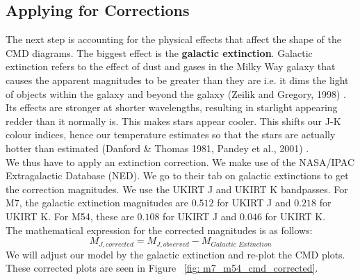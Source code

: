 \documentclass[12pt]{article}
\begin{document}
		\subsection{Applying for Corrections}
		The next step is accounting for the physical effects that affect the shape of the CMD diagrams. The biggest effect is the \textbf{galactic extinction}. Galactic extinction refers to the effect of dust and gases in the Milky Way galaxy that causes the apparent magnitudes to be greater than they are i.e. it dims the light of objects within the galaxy and beyond the galaxy (Zeilik and Gregory, 1998) \cite{zeilik}.\\
		Its effects are stronger at shorter wavelengths, resulting in starlight appearing redder than it normally is. This makes stars appear cooler. This shifts our J-K colour indices, hence our temperature estimates so that the stars are actually hotter than estimated (Danford \& Thomas 1981, Pandey et al., 2001) \cite{pandey}.\\
		We thus have to apply an extinction correction. We make use of the NASA/IPAC Extragalactic Database (NED). We go to their tab on galactic extinctions to get the correction magnitudes. We use the UKIRT J and UKIRT K bandpasses. For M7, the galactic extinction magnitudes are $0.512$ for UKIRT J and $0.218$ for UKIRT K. For M54, these are $0.108$ for UKIRT J and $0.046$ for UKIRT K.\\
		The mathematical expression for the corrected magnitudes is as follows:
		\[M_{J, corrected} = M_{J, observed} - M_{Galactic \,\, Extinction}\]
		We will adjust our model by the galactic extinction and re-plot the CMD plots. These corrected plots are seen in Figure ~\ref{fig: m7_m54_cmd_corrected}.
\end{document}
